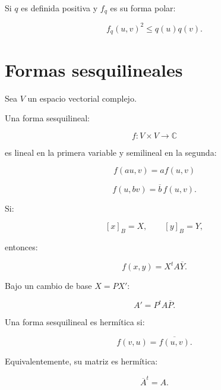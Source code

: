 \documentclass[11pt,a4paper]{article}
\newcommand{\C}{\mathbb{C}}
\begin{document}
Si $q$ es definida positiva y $f_q$ es su forma polar:

\[
\boxed{
f_q(u,v)^2
\leq
q(u)q(v).
}
\]

\section{Formas sesquilineales}

Sea $V$ un espacio vectorial complejo.

Una forma sesquilineal:

\[
f:V\times V\longrightarrow\C
\]

es lineal en la primera variable y semilineal en la segunda:

\[
f(au,v)=af(u,v)
\]

\[
f(u,bv)=\overline b\,f(u,v).
\]

Si:

\[
[x]_B=X,
\qquad
[y]_B=Y,
\]

entonces:

\[
\boxed{
f(x,y)=X^tA\overline Y.
}
\]

Bajo un cambio de base $X=PX'$:

\[
\boxed{
A'=P^tA\overline P.
}
\]

Una forma sesquilineal es hermítica si:

\[
\boxed{
f(v,u)=\overline{f(u,v)}.
}
\]

Equivalentemente, su matriz es hermítica:

\[
\boxed{
\overline A^t=A.
}
\]
\end{document}
